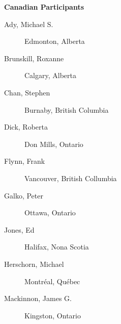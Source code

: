 \documentclass{article}
\begin{document}
\textbf{\large Canadian Participants}
\begin{description}
\item[Ady, Michael S.] Edmonton, Alberta
\item[Brunskill, Roxanne] Calgary, Alberta
\item[Chan, Stephen] Burnaby, British Columbia
\item[Dick, Roberta] Don Mills, Ontario
\item[Flynn, Frank] Vancouver, British Collumbia
\item[Galko, Peter] Ottawa, Ontario
\item[Jones, Ed] Halifax, Nona Scotia
\item[Herschorn, Michael] Montr\'eal, Qu\'ebec
\item[Mackinnon, James G.] Kingston, Ontario
\end{description}
\end{document}
